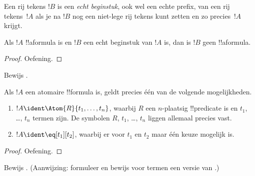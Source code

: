 \documentclass[../../../include/open-logic-section]{subfiles}
\begin{document}
\begin{defn}
Een rij tekens $!B$ is een \emph{echt beginstuk}, ook wel een echte
prefix, van een rij tekens~$!A$ als je na $!B$ nog een niet-lege rij
tekens kunt zetten en zo precies~$!A$ krijgt.
\end{defn}

\begin{lem}
Als $!A$ !!a{formula} is en $!B$ een echt beginstuk van $!A$ is, dan
is $!B$ geen !!a{formula}.
\end{lem}

\begin{proof}
Oefening.
\end{proof}

\begin{prob}
Bewijs .
\end{prob}

\begin{prop}
Als $!A$ een atomaire !!{formula} is, geldt precies één van de volgende
mogelijkheden.
\begin{enumerate}
\item $!A \ident \Atom{R}{t_1,\dots,t_n}$, waarbij $R$ een $n$-plaatsig
  !!{predicate} is en $t_1$, \dots, $t_n$ termen zijn. De symbolen $R$,
  $t_1$, \dots, $t_n$ liggen allemaal precies vast.
\item $!A \ident \eq[t_1][t_2]$, waarbij er voor $t_1$ en $t_2$ maar
  één keuze mogelijk is.
\end{enumerate}
\end{prop}

\begin{proof}
Oefening.
\end{proof}

\begin{prob}
Bewijs . (Aanwijzing: formuleer
en bewijs voor termen een versie van .)
\end{prob}
\end{document}
